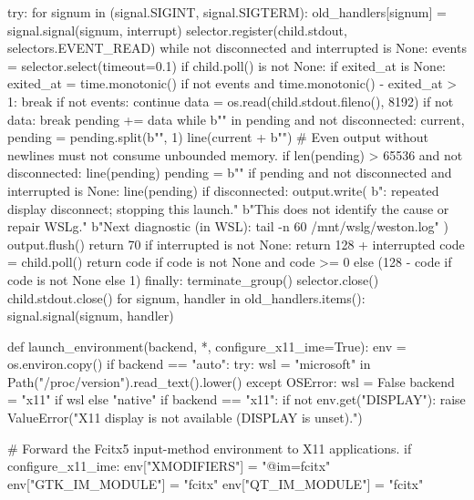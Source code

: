     try:
        for signum in (signal.SIGINT, signal.SIGTERM):
            old_handlers[signum] = signal.signal(signum, interrupt)
        selector.register(child.stdout, selectors.EVENT_READ)
        while not disconnected and interrupted is None:
            events = selector.select(timeout=0.1)
            if child.poll() is not None:
                if exited_at is None:
                    exited_at = time.monotonic()
                if not events and time.monotonic() - exited_at > 1:
                    break
            if not events:
                continue
            data = os.read(child.stdout.fileno(), 8192)
            if not data:
                break
            pending += data
            while b"\n" in pending and not disconnected:
                current, pending = pending.split(b"\n", 1)
                line(current + b"\n")
            # Even output without newlines must not consume unbounded memory.
            if len(pending) > 65536 and not disconnected:
                line(pending)
                pending = b""
        if pending and not disconnected and interrupted is None:
            line(pending)
        if disconnected:
            output.write(
                b"\nYohaku: repeated display disconnect; stopping this launch.\n"
                b"This does not identify the cause or repair WSLg.\n"
                b"Next diagnostic (in WSL): tail -n 60 /mnt/wslg/weston.log\n"
            )
            output.flush()
            return 70
        if interrupted is not None:
            return 128 + interrupted
        code = child.poll()
        return code if code is not None and code >= 0 else (128 - code if code is not None else 1)
    finally:
        terminate_group()
        selector.close()
        child.stdout.close()
        for signum, handler in old_handlers.items():
            signal.signal(signum, handler)


def launch_environment(backend, *, configure_x11_ime=True):
    env = os.environ.copy()
    if backend == "auto":
        try: wsl = "microsoft" in Path("/proc/version").read_text().lower()
        except OSError: wsl = False
        backend = "x11" if wsl else "native"
    if backend == "x11":
        if not env.get("DISPLAY"):
            raise ValueError("X11 display is not available (DISPLAY is unset).")

        # Forward the Fcitx5 input-method environment to X11 applications.
        if configure_x11_ime:
            env["XMODIFIERS"] = "@im=fcitx"
            env["GTK_IM_MODULE"] = "fcitx"
            env["QT_IM_MODULE"] = "fcitx"

